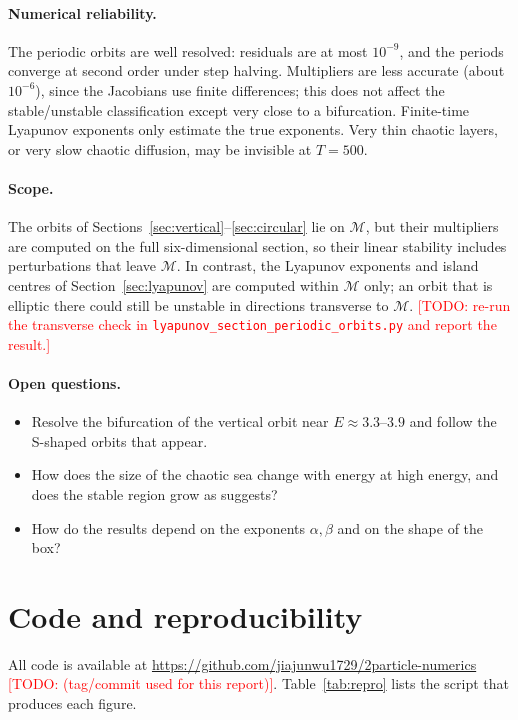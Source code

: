 \documentclass[11pt,a4paper]{article}
\newcommand{\todo}[1]{\textcolor{red}{[TODO: #1]}}
\newcommand{\M}{\mathcal{M}}
\begin{document}
\paragraph{Numerical reliability.}
The periodic orbits are well resolved: residuals are at most $10^{-9}$, and the
periods converge at second order under step halving. Multipliers are less
accurate (about $10^{-6}$), since the Jacobians use finite differences; this
does not affect the stable/unstable classification except very close to a
bifurcation. Finite-time Lyapunov exponents only estimate the true exponents.
Very thin chaotic layers, or very slow chaotic diffusion, may be invisible at
$T=500$.

\paragraph{Scope.}
The orbits of Sections~\ref{sec:vertical}--\ref{sec:circular} lie on $\M$,
but their multipliers are computed on the full six-dimensional section, so
their linear stability includes perturbations that leave $\M$. In contrast,
the Lyapunov exponents and island centres of Section~\ref{sec:lyapunov} are
computed within $\M$ only; an orbit that is elliptic there could still be
unstable in directions transverse to $\M$. \todo{re-run the transverse check in
\texttt{lyapunov\_section\_periodic\_orbits.py} and report the result.}

\paragraph{Open questions.}
\begin{itemize}
  \item Resolve the bifurcation of the vertical orbit near $E\approx3.3$--$3.9$
        and follow the S-shaped orbits that appear.
  \item How does the size of the chaotic sea change with energy at high energy,
        and does the stable region grow as \cite{turaev2022} suggests?
  \item How do the results depend on the exponents $\alpha,\beta$ and on the
        shape of the box?
\end{itemize}

\section*{Code and reproducibility}
All code is available at
\url{https://github.com/jiajunwu1729/2particle-numerics}
\todo{(tag/commit used for this report)}. Table~\ref{tab:repro} lists the
script that produces each figure.
\end{document}
